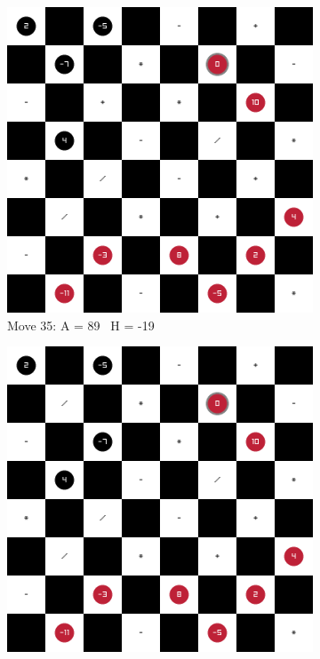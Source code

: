 \begin{figure}[H]
\centering
    \begin{subfigure}{0.3\textwidth}
        \centering
        \includegraphics[width=\textwidth]{images/games/game4/move_35.png}
        \caption*{Move 35: A = 89 \textbar\ H = -19}
    \end{subfigure}
    \quad
    \begin{subfigure}{0.3\textwidth}
        \centering
        \includegraphics[width=\textwidth]{images/games/game4/move_36.png}

\end{subfigure}
\end{figure}
